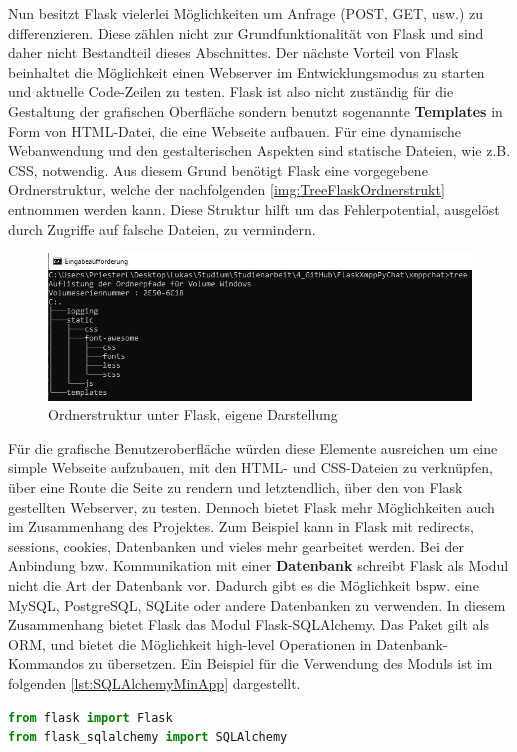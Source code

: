 \documentclass[a4paper,titlepage,halfparskip,12pt]{scrreprt}
\begin{document}
\begin{onehalfspacing}
Nun besitzt Flask vielerlei Möglichkeiten um Anfrage (POST, GET, usw.) zu differenzieren. Diese zählen nicht zur Grundfunktionalität von Flask und sind daher nicht Bestandteil dieses Abschnittes. Der nächste Vorteil von Flask beinhaltet die Möglichkeit einen Webserver im Entwicklungsmodus zu starten und aktuelle Code-Zeilen zu testen.
Flask ist also nicht zuständig für die Gestaltung der grafischen Oberfläche sondern benutzt sogenannte \textbf{Templates} in Form von HTML-Datei, die eine Webseite aufbauen. Für eine dynamische Webanwendung und den gestalterischen Aspekten sind statische Dateien, wie z.B. \ac{CSS}, notwendig. Aus diesem Grund benötigt Flask eine vorgegebene Ordnerstruktur, welche der nachfolgenden \autoref{img:TreeFlaskOrdnerstrukt} entnommen werden kann. Diese Struktur hilft um das Fehlerpotential, ausgelöst durch Zugriffe auf falsche Dateien, zu vermindern.
\begin{figure}[h]
	\centering
	\includegraphics[width=\textwidth]{images/TreeFlaskOrdnerstrukt}
	\caption{Ordnerstruktur unter Flask, eigene Darstellung}
	\label{img:TreeFlaskOrdnerstrukt}
\end{figure}
Für die grafische Benutzeroberfläche würden diese Elemente ausreichen um eine simple Webseite aufzubauen, mit den \ac{HTML}- und \ac{CSS}-Dateien zu verknüpfen, über eine Route die Seite zu rendern und letztendlich, über den von Flask gestellten Webserver, zu testen. Dennoch bietet Flask mehr Möglichkeiten auch im Zusammenhang des Projektes. Zum Beispiel kann in Flask mit redirects, sessions, cookies, Datenbanken und vieles mehr gearbeitet werden. Bei der Anbindung bzw. Kommunikation mit einer \textbf{Datenbank} schreibt Flask als Modul nicht die Art der Datenbank vor. Dadurch gibt es die Möglichkeit bspw. eine MySQL, PostgreSQL, SQLite oder andere Datenbanken zu verwenden. In diesem Zusammenhang bietet Flask das Modul Flask-SQLAlchemy. Das Paket gilt als \ac{ORM}, und bietet die Möglichkeit high-level Operationen in Datenbank-Kommandos zu übersetzen. Ein Beispiel für die Verwendung des Moduls ist im folgenden \autoref{lst:SQLAlchemyMinApp} dargestellt.
\begin{lstlisting}[language=Python,caption=Example Listing of Flask-SQLAlchemy,label={lst:SQLAlchemyMinApp}]
from flask import Flask
from flask_sqlalchemy import SQLAlchemy


\end{lstlisting}
\end{onehalfspacing}
\end{document}
